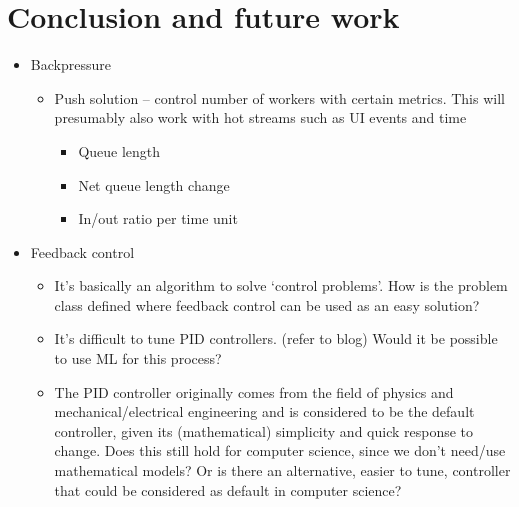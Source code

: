 \chapter{Conclusion and future work}

\begin{itemize}
	\item Backpressure
	\begin{itemize}
		\item Push solution – control number of workers with certain metrics. This will presumably also work with hot streams such as UI events and time
		\begin{itemize}
			\item Queue length
			\item Net queue length change
			\item In/out ratio per time unit
		\end{itemize}
	\end{itemize}
	\item Feedback control
	\begin{itemize}
		\item It’s basically an algorithm to solve ‘control problems’. How is the problem class defined where feedback control can be used as an easy solution?
		\item It’s difficult to tune PID controllers. (refer to blog) Would it be possible to use ML for this process?
		\item The PID controller originally comes from the field of physics and mechanical/electrical engineering and is considered to be the default controller, given its (mathematical) simplicity and quick response to change. Does this still hold for computer science, since we don’t need/use mathematical models? Or is there an alternative, easier to tune, controller that could be considered as default in computer science?
	\end{itemize}
\end{itemize}